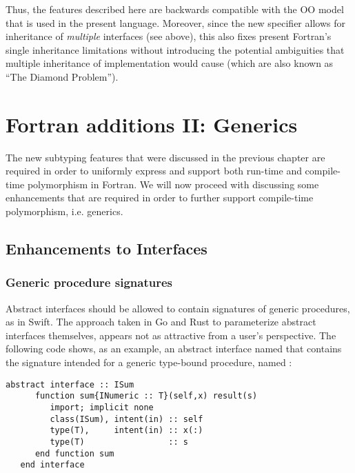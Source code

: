 \documentclass[11pt,oneside]{report}
\newcommand{\code}[1]{{\selectfont\ttfamily{#1}}}
\begin{document}
Thus, the features described here are backwards compatible with the OO
model that is used in the present language. Moreover, since the new
\code{implements} specifier allows for inheritance of \emph{multiple}
interfaces (see above), this also fixes present Fortran's single
inheritance limitations without introducing the potential ambiguities
that multiple inheritance of implementation would cause (which are
also known as ``The Diamond Problem'').


\chapter{Fortran additions II: Generics}

The new subtyping features that were discussed in the previous chapter
are required in order to uniformly express and support both run-time
and compile-time polymorphism in Fortran. We will now proceed with
discussing some enhancements that are required in order to further
support compile-time polymorphism, i.e. generics.

\section{Enhancements to Interfaces}

\subsection{Generic procedure signatures} 
\label{sect:generic_interfaces}

Abstract interfaces should be allowed to contain signatures of generic
procedures, as in Swift. The approach taken in Go and Rust to
parameterize abstract interfaces themselves, appears not as attractive
from a user's perspective. The following code shows, as an example, an
abstract interface named \code{ISum} that contains the signature
intended for a generic type-bound procedure, named \code{sum}:
\begin{lstlisting}[language=LFortran,style=boxed]
   abstract interface :: ISum
      function sum{INumeric :: T}(self,x) result(s)
         import; implicit none
         class(ISum), intent(in) :: self
         type(T),     intent(in) :: x(:)
         type(T)                 :: s
      end function sum
   end interface
\end{lstlisting}
\end{document}
